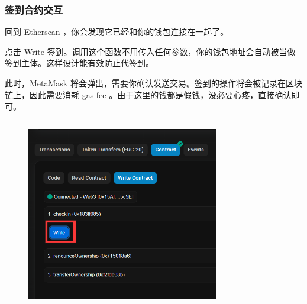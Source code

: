 \documentclass{beamer}
\begin{document}
\begin{frame}
    \frametitle{签到合约交互}

    回到 Etherscan ，你会发现它已经和你的钱包连接在一起了。

    点击 Write 签到。调用这个函数不用传入任何参数，你的钱包地址会自动被当做签到主体。这样设计能有效防止代签到。

    此时，MetaMask 将会弹出，需要你确认发送交易。签到的操作将会被记录在区块链上，因此需要消耗 gas fee 。由于这里的钱都是假钱，没必要心疼，直接确认即可。

    \begin{columns}
        \begin{column}{0.5\textwidth}
            \begin{figure}[htbp]
                \centering
                \includegraphics[width=0.9\textwidth]{s5.png}
            \end{figure}
        \end{column}
        \begin{column}{0.25\textwidth}
            \begin{figure}[htbp]
                \centering

\end{figure}
\end{column}
\end{columns}
\end{frame}
\end{document}
